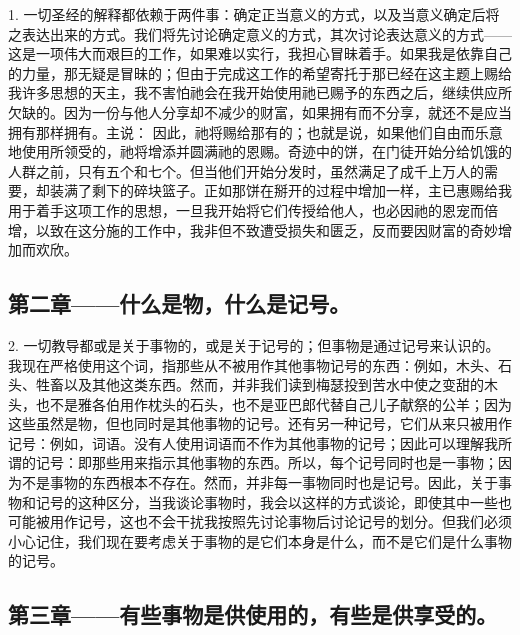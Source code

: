 1. 一切圣经的解释都依赖于两件事：确定正当意义的方式，以及当意义确定后将之表达出来的方式。我们将先讨论确定意义的方式，其次讨论表达意义的方式——这是一项伟大而艰巨的工作，如果难以实行，我担心冒昧着手。如果我是依靠自己的力量，那无疑是冒昧的；但由于完成这工作的希望寄托于那已经在这主题上赐给我许多思想的天主，我不害怕祂会在我开始使用祂已赐予的东西之后，继续供应所欠缺的。因为一份与他人分享却不减少的财富，如果拥有而不分享，就还不是应当拥有那样拥有。主说： 因此，祂将赐给那有的；也就是说，如果他们自由而乐意地使用所领受的，祂将增添并圆满祂的恩赐。奇迹中的饼，在门徒开始分给饥饿的人群之前，只有五个和七个。但当他们开始分发时，虽然满足了成千上万人的需要，却装满了剩下的碎块篮子。正如那饼在掰开的过程中增加一样，主已惠赐给我用于着手这项工作的思想，一旦我开始将它们传授给他人，也必因祂的恩宠而倍增，以致在这分施的工作中，我非但不致遭受损失和匮乏，反而要因财富的奇妙增加而欢欣。\par


\subsection{第二章——什么是物，什么是记号。}

2. 一切教导都或是关于事物的，或是关于记号的；但事物是通过记号来认识的。我现在严格使用这个词，指那些从不被用作其他事物记号的东西：例如，木头、石头、牲畜以及其他这类东西。然而，并非我们读到梅瑟投到苦水中使之变甜的木头，也不是雅各伯用作枕头的石头，也不是亚巴郎代替自己儿子献祭的公羊；因为这些虽然是物，但也同时是其他事物的记号。还有另一种记号，它们从来只被用作记号：例如，词语。没有人使用词语而不作为其他事物的记号；因此可以理解我所谓的记号：即那些用来指示其他事物的东西。所以，每个记号同时也是一事物；因为不是事物的东西根本不存在。然而，并非每一事物同时也是记号。因此，关于事物和记号的这种区分，当我谈论事物时，我会以这样的方式谈论，即使其中一些也可能被用作记号，这也不会干扰我按照先讨论事物后讨论记号的划分。但我们必须小心记住，我们现在要考虑关于事物的是它们本身是什么，而不是它们是什么事物的记号。\par


\subsection{第三章——有些事物是供使用的，有些是供享受的。}


